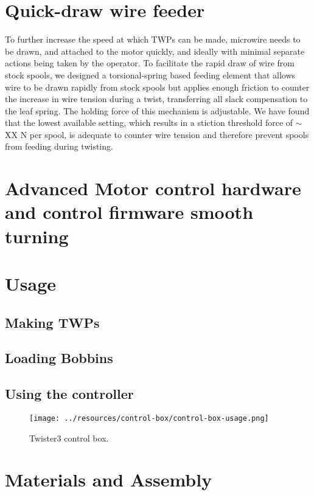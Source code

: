 \documentclass[11pt,a4paper]{article}
\begin{document}
\section{Quick-draw wire feeder} 
To further increase the speed at which TWPs can be made, microwire needs to be
drawn, and attached to the  motor quickly, and ideally with minimal separate
actions being taken by the operator. To facilitate the rapid draw of wire from
stock spools, we designed a torsional-spring based feeding element that allows
wire to be drawn rapidly from stock spools but applies enough friction to
counter the increase in wire tension during a twist, transferring all slack
compensation to the leaf spring. The holding force of this mechanism is
adjustable. We have found that the lowest available setting, which results in a
stiction threshold force of $\sim$XX N per spool, is adequate to counter wire
tension and therefore prevent spools from feeding during twisting.

\section{Advanced Motor control hardware and control firmware smooth turning}

\section{Usage}

\subsection{Making TWPs}


\subsection{Loading Bobbins}


\subsection{Using the controller}

\begin{figure}
    \centering
    \texttt{[image: ../resources/control-box/control-box-usage.png]}
    \caption{Twister3 control box.}
    \label{f:ctrl-box}
\end{figure}

\section{Materials and Assembly}
\end{document}
